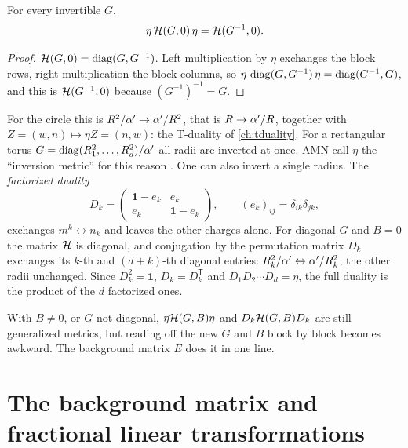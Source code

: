 \begin{theorem}[Full duality at $B=0$ \TA]\label{thm:genmetric:inversion}
For every invertible $G$,
\begin{equation}\label{eq:genmetric:inversion}
 \eta\,\mathcal{H}(G,0)\,\eta=\mathcal{H}(G^{-1},0).
\end{equation}
\end{theorem}
\begin{proof}
$\mathcal{H}(G,0)=\operatorname{diag}(G,G^{-1})$. Left multiplication by $\eta$ exchanges the block rows, right
multiplication the block columns, so $\eta\,\operatorname{diag}(G,G^{-1})\,\eta=\operatorname{diag}(G^{-1},G)$, and this
is $\mathcal{H}(G^{-1},0)$ because $(G^{-1})^{-1}=G$.
\end{proof}
\noindent For the circle this is $R^2/\alpha'\to\alpha'/R^2$, that is $R\to\alpha'/R$, together with
$Z=(w,n)\mapsto\eta Z=(n,w)$: the T-duality of \cref{ch:tduality}. For a rectangular torus
$G=\operatorname{diag}(R_1^2,\dots,R_d^2)/\alpha'$ all radii are inverted at once. AMN call $\eta$ the
``inversion metric'' for this reason . One can also invert a
single radius. The \emph{factorized duality}
\begin{equation}\label{eq:genmetric:Dk}
 D_k=\begin{pmatrix}\mathbf 1-e_k&e_k\\e_k&\mathbf 1-e_k\end{pmatrix},
 \qquad (e_k)_{ij}=\delta_{ik}\delta_{jk},
\end{equation}
 exchanges $m^k\leftrightarrow n_k$ and
leaves the other charges alone. For diagonal $G$ and $B=0$ the matrix $\mathcal{H}$ is diagonal,
and conjugation by the permutation matrix $D_k$ exchanges its $k$-th and $(d+k)$-th
diagonal entries: $R_k^2/\alpha'\leftrightarrow\alpha'/R_k^2$, the other radii unchanged. Since
$D_k^2=\mathbf 1$, $D_k=D_k^{\mathsf T}$ and $D_1D_2\cdots D_d=\eta$, the full duality is
the product of the $d$ factorized ones.

With $B\ne0$, or $G$ not diagonal, $\eta\mathcal{H}(G,B)\eta$ and $D_k\mathcal{H}(G,B)D_k$ are still
generalized metrics, but reading off the new $G$ and $B$ block by block becomes awkward.
The background matrix $E$ does it in one line.

\section{The background matrix and fractional linear transformations}
\label{sec:genmetric:fractional}

